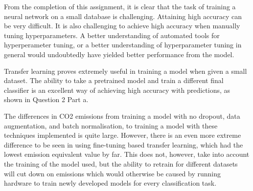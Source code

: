 From the completion of this assignment, it is clear that the task of training a
neural network on a small database is challenging. Attaining high accuracy can
be very difficult. It is also challenging to achieve high accuracy when manually
tuning hyperparameters. A better understanding of automated tools for
hyperperameter tuning, or a better understanding of hyperparameter tuning in
general would undoubtedly have yielded better performance from the model.

Transfer learning proves extremely useful in training a model when given a small
dataset. The ability to take a pretrained model and train a different final
classifier is an excellent way of achieving high accuracy with predictions, as
shown in Question 2 Part a.

The differences in CO2 emissions from training a model with no dropout, data
augmentation, and batch normalisation, to training a model with these techniques
implemented is quite large. However, there is an even more extreme difference to
be seen in using fine-tuning based transfer learning, which had the lowest
emission equivalent value by far. This does not, however, take into account the
training of the model used, but the ability to retrain for different datasets
will cut down on emissions which would otherwise be caused by running hardware
to train newly developed models for every classification task.
